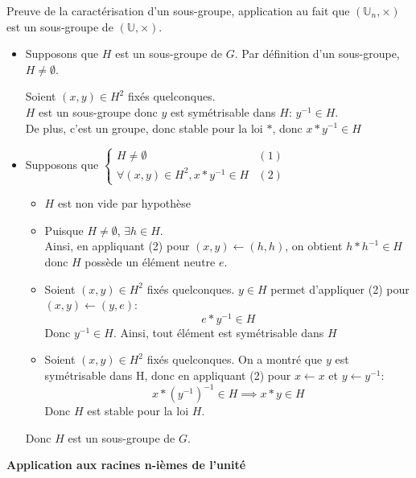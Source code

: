 \documentclass{article}
\begin{document}
\begin{question_kholle}{Preuve de la caractérisation d'un sous-groupe, application au fait que $(\mathbb U _n, \times)$ est un sous-groupe de $(\mathbb U, \times)$.}
  \;\\
  \begin{itemize}[label=$\star$]
    \item Supposons que $H$ est un sous-groupe de $G$.
          Par définition d'un sous-groupe, $H \neq \emptyset$.

          Soient $(x, y) \in H^{2}$ fixés quelconques.\\
          $H$ est un sous-groupe donc $y$ est symétrisable dans $H$: $y^{-1} \in H$.\\
          De plus, c'est un groupe, donc stable pour la loi $*$, donc $x*y^{-1} \in H$

    \item Supposons que $\left\{ \begin{array}{ll}H \neq \emptyset &(1) \\\forall (x, y) \in H^{2}, x * y^{-1} \in H & (2)\end{array}\right.$
          \begin{itemize}[label=$\lozenge$]
            \item $H$ est non vide par hypothèse
            \item Puisque $H \neq \emptyset$, $\exists h \in H$.\\
                  Ainsi, en appliquant (2) pour $(x,y)\leftarrow (h,h)$, on obtient $h * h^{-1} \in H$ donc $H$ possède un élément neutre $e$.
            \item Soient $(x, y) \in H^{2}$ fixés quelconques.
                  $y \in H$ permet d'appliquer (2) pour $(x,y) \leftarrow (y,e)$:
                  $$
                    e * y^{-1} \in H
                  $$
                  Donc $y^{-1} \in H$. Ainsi, tout élément est symétrisable dans $H$
            \item Soient $(x, y) \in H^{2}$ fixés quelconques. On a montré que $y$ est symétrisable dans H, donc en appliquant (2) pour $x \leftarrow x$ et $y \leftarrow y^{-1}$:
                  $$
                    x * (y^{-1})^{-1} \in H \implies x* y \in H
                  $$
                  Donc $H$ est stable pour la loi $H$.
          \end{itemize}
          Donc $H$ est un sous-groupe de $G$.
  \end{itemize}
\end{question_kholle}
\textbf{Application aux racines n-ièmes de l'unité}
\end{document}
